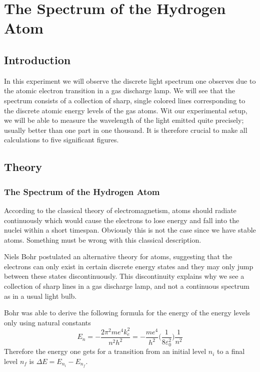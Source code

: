 \chapter{The Spectrum of the Hydrogen Atom}
\section{Introduction}
In this experiment we will observe the discrete light spectrum one observes due to the atomic electron transition in a gas discharge lamp. We will see that the spectrum consists of a collection of sharp, single colored lines corresponding to the discrete atomic energy levels of the gas atoms. Wit our experimental setup, we will be able to measure the wavelength of the light emitted quite precisely; usually better than one part in one thousand. It is therefore crucial to make all calculations to five  significant figures.

\section{Theory}
\subsection{The Spectrum of the Hydrogen Atom}
According to the classical theory of electromagnetism, atoms should radiate continuously which would cause the electrons to lose energy and fall into the nuclei within a short timespan. Obviously this is not the case since we have stable atoms. Something must be wrong with this classical description.\myskip

Niels Bohr postulated an alternative theory for atoms, suggesting that the electrons can only exist in certain discrete energy states and they may only jump between these states discontinuously. This discontinuity explains why we see a collection of sharp lines in a gas discharge lamp, and not a continuous spectrum as in a usual light bulb. \myskip

Bohr was able to derive the following formula for the energy of the energy levels only using natural constants
\begin{equation}
  E_{n}=-\frac{2\pi^2 me^4k^{2}_{e}}{n^2h^2}=-\frac{me^4}{h^2}\bigg(\frac{1}{8\varepsilon^{2}_{0}}\bigg)\frac{1}{n^2}
\end{equation}
Therefore the energy one gets for a transition from an initial level $n_i$ to a final level $n_f$ is $\Delta E = E_{n_{i}} - E_{n_{f}}$.\myskip

